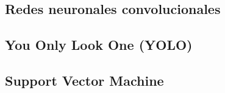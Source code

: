  \subsection{Redes neuronales convolucionales}
 
 \subsection{You Only Look One (YOLO)}
 
 \subsection{Support Vector Machine}
 
 
 